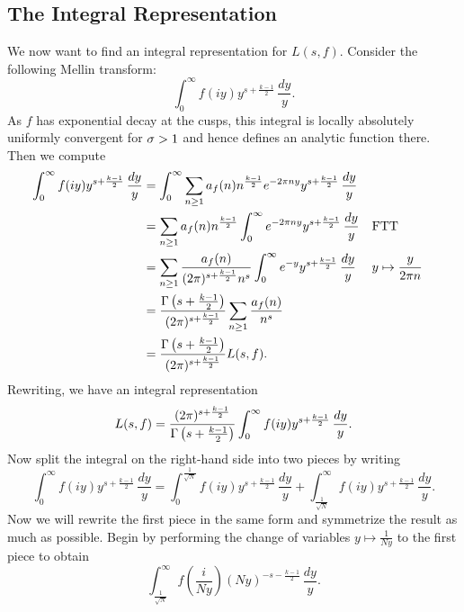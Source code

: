     \subsection*{The Integral Representation}
      We now want to find an integral representation for $L(s,f)$. Consider the following Mellin transform:
      \[
        \int_{0}^{\infty}f(iy)y^{s+\frac{k-1}{2}}\,\frac{dy}{y}.
      \]
      As $f$ has exponential decay at the cusps, this integral is locally absolutely uniformly convergent for $\sigma > 1$ and hence defines an analytic function there. Then we compute
      \begin{align*}
        \int_{0}^{\infty}f(iy)y^{s+\frac{k-1}{2}}\,\frac{dy}{y} &= \int_{0}^{\infty}\sum_{n \ge 1}a_{f}(n)n^{\frac{k-1}{2}}e^{-2\pi ny}y^{s+\frac{k-1}{2}}\,\frac{dy}{y} \\
        &= \sum_{n \ge 1}a_{f}(n)n^{\frac{k-1}{2}}\int_{0}^{\infty}e^{-2\pi ny}y^{s+\frac{k-1}{2}}\,\frac{dy}{y} &&\text{FTT} \\
        &= \sum_{n \ge 1}\frac{a_{f}(n)}{(2\pi)^{s+\frac{k-1}{2}}n^{s}}\int_{0}^{\infty}e^{-y}y^{s+\frac{k-1}{2}}\,\frac{dy}{y} &&\text{$y \mapsto \frac{y}{2\pi n}$} \\
        &= \frac{\Gamma\left(s+\frac{k-1}{2}\right)}{(2\pi)^{s+\frac{k-1}{2}}}\sum_{n \ge 1}\frac{a_{f}(n)}{n^{s}} \\
        &= \frac{\Gamma\left(s+\frac{k-1}{2}\right)}{(2\pi)^{s+\frac{k-1}{2}}}L(s,f).
      \end{align*}
      Rewriting, we have an integral representation
      \begin{equation}\label{equ:integral_representation_holomorphic_1}
        L(s,f) = \frac{(2\pi)^{s+\frac{k-1}{2}}}{\Gamma\left(s+\frac{k-1}{2}\right)}\int_{0}^{\infty}f(iy)y^{s+\frac{k-1}{2}}\,\frac{dy}{y}.
      \end{equation}
      Now split the integral on the right-hand side into two pieces by writing
      \begin{equation}\label{equ:symmetric_integral_holomorphic_split}
        \int_{0}^{\infty}f(iy)y^{s+\frac{k-1}{2}}\,\frac{dy}{y} = \int_{0}^{\frac{1}{\sqrt{N}}}f(iy)y^{s+\frac{k-1}{2}}\,\frac{dy}{y}+\int_{\frac{1}{\sqrt{N}}}^{\infty}f(iy)y^{s+\frac{k-1}{2}}\,\frac{dy}{y}.
      \end{equation}
      Now we will rewrite the first piece in the same form and symmetrize the result as much as possible. Begin by performing the change of variables $y \mapsto \frac{1}{Ny}$ to the first piece to obtain
      \[
        \int_{\frac{1}{\sqrt{N}}}^{\infty}f\left(\frac{i}{Ny}\right)(Ny)^{-s-\frac{k-1}{2}}\,\frac{dy}{y}.
      \]
